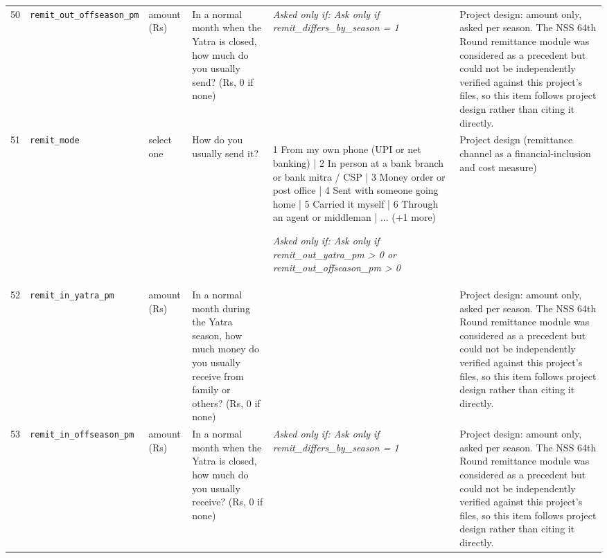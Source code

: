 \documentclass[9pt,a4paper,landscape]{article}
\begin{document}
\begin{longtable}{@{}p{0.5cm}p{3.3cm}p{1.7cm}p{7.3cm}p{5.6cm}p{5.4cm}@{}}
\footnotesize 50 & \footnotesize\texttt{remit\_out\_offseason\_pm} & \scriptsize amount (Rs) & \footnotesize In a normal month when the Yatra is closed, how much do you usually send? (Rs, 0 if none)\par\vspace{1pt}{\footnotesize\color{hdr}{\hifont जब यात्रा बंद रहती है, उस आम महीने में कितना भेजते हैं? (रुपये, न भेजते हों तो 0)}} & \scriptsize \textit{Asked only if: Ask only if remit\_differs\_by\_season = 1} & \scriptsize Project design: amount only, asked per season. The NSS 64th Round remittance module was considered as a precedent but could not be independently verified against this project's files, so this item follows project design rather than citing it directly.\\
\footnotesize 51 & \footnotesize\texttt{remit\_mode} & \scriptsize select one & \footnotesize How do you usually send it?\par\vspace{1pt}{\footnotesize\color{hdr}{\hifont आप पैसा आम तौर पर कैसे भेजते हैं?}} & \scriptsize 1 From my own phone (UPI or net banking) | 2 In person at a bank branch or bank mitra / CSP | 3 Money order or post office | 4 Sent with someone going home | 5 Carried it myself | 6 Through an agent or middleman | ... (+1 more)\par\vspace{1pt}\textit{Asked only if: Ask only if remit\_out\_yatra\_pm > 0 or remit\_out\_offseason\_pm > 0} & \scriptsize Project design (remittance channel as a financial-inclusion and cost measure)\\
\footnotesize 52 & \footnotesize\texttt{remit\_in\_yatra\_pm} & \scriptsize amount (Rs) & \footnotesize In a normal month during the Yatra season, how much money do you usually receive from family or others? (Rs, 0 if none)\par\vspace{1pt}{\footnotesize\color{hdr}{\hifont यात्रा के मौसम के आम महीने में, घरवालों या किसी और से आपको कितना पैसा मिलता है? (रुपये, न मिलता हो तो 0)}} & \scriptsize  & \scriptsize Project design: amount only, asked per season. The NSS 64th Round remittance module was considered as a precedent but could not be independently verified against this project's files, so this item follows project design rather than citing it directly.\\
\footnotesize 53 & \footnotesize\texttt{remit\_in\_offseason\_pm} & \scriptsize amount (Rs) & \footnotesize In a normal month when the Yatra is closed, how much do you usually receive? (Rs, 0 if none)\par\vspace{1pt}{\footnotesize\color{hdr}{\hifont जब यात्रा बंद रहती है, उस आम महीने में कितना मिलता है? (रुपये, न मिलता हो तो 0)}} & \scriptsize \textit{Asked only if: Ask only if remit\_differs\_by\_season = 1} & \scriptsize Project design: amount only, asked per season. The NSS 64th Round remittance module was considered as a precedent but could not be independently verified against this project's files, so this item follows project design rather than citing it directly.\\

\end{longtable}
\end{document}

